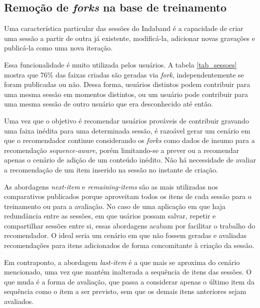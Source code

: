 \subsection{Remoção de \textit{forks} na base de treinamento} 

Uma característica particular das sessões do Indaband é a capacidade de criar
uma sessão a partir de outra já existente, modificá-la, adicionar novas
gravações e publicá-la como uma nova iteração.

Essa funcionalidade é muito utilizada pelos usuários. A tabela \ref{tab_sessoes}
mostra que 76\% das faixas criadas são geradas via \textit{fork},
independentemente se foram publicadas ou não. Dessa forma, usuários distintos
podem contribuir para uma mesma sessão em momentos distintos, ou um usuário pode
contribuir para uma mesma sessão de outro usuário que era desconhecido até
então.

Uma vez que o objetivo é recomendar usuários prováveis de contribuir gravando
uma faixa inédita para uma determinada sessão, é razoável gerar um cenário em
que o recomendador continue considerando os \textit{forks} como dados de insumo
para a recomendação \textit{sequence-aware}, porém limitando-se a prever ou a
recomendar apenas o cenário de adição de um conteúdo inédito. Não há necessidade
de avaliar a recomendação de um item inserido na sessão no instante de criação.

As abordagens \textit{next-item} e \textit{remaining-items} são as mais
utilizadas nos comparativos publicados porque aproveitam todos os itens de
cada sessão para o treinamento ou para a avaliação. No caso de uma aplicação em
que haja redundância entre as sessões, em que usários possam salvar, repetir e
compartilhar sessões entre si, essas abordagens acabam por facilitar o trabalho
do recomendador. O ideal seria um cenário em que não fossem geradas e avaliadas
recomendações para itens adicionados de forma concomitante à criação
da sessão.

Em contraponto, a abordagem \textit{last-item} é a que mais se aproxima do
cenário mencionado, uma vez que mantém inalterada a sequência de itens das
sessões. O que muda é a forma de avaliação, que passa a considerar apenas o
último item da sequência como o item a ser previsto, sem que os demais itens
anteriores sejam avaliados.

